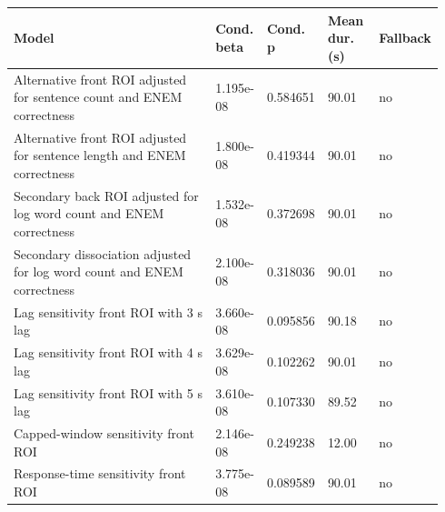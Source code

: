 \begin{tabular}{p{0.52\linewidth}p{0.12\linewidth}p{0.10\linewidth}p{0.12\linewidth}p{0.08\linewidth}}
\toprule
Model & Cond. beta & Cond. p & Mean dur. (s) & Fallback\\
\midrule
Alternative front ROI adjusted for sentence count and ENEM correctness & 1.195e-08 & 0.584651 & 90.01 & no\\
Alternative front ROI adjusted for sentence length and ENEM correctness & 1.800e-08 & 0.419344 & 90.01 & no\\
Secondary back ROI adjusted for log word count and ENEM correctness & 1.532e-08 & 0.372698 & 90.01 & no\\
Secondary dissociation adjusted for log word count and ENEM correctness & 2.100e-08 & 0.318036 & 90.01 & no\\
Lag sensitivity front ROI with 3 s lag & 3.660e-08 & 0.095856 & 90.18 & no\\
Lag sensitivity front ROI with 4 s lag & 3.629e-08 & 0.102262 & 90.01 & no\\
Lag sensitivity front ROI with 5 s lag & 3.610e-08 & 0.107330 & 89.52 & no\\
Capped-window sensitivity front ROI & 2.146e-08 & 0.249238 & 12.00 & no\\
Response-time sensitivity front ROI & 3.775e-08 & 0.089589 & 90.01 & no\\
\bottomrule
\end{tabular}

